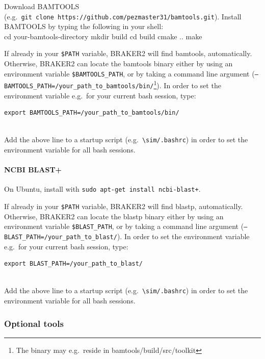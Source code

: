 \documentclass[]{article}
\let\oldparagraph\paragraph
\renewcommand{\paragraph}[1]{\oldparagraph{#1}\mbox{}}
\begin{document}
Download BAMTOOLS
(e.g.~\texttt{git\ clone\ https://github.com/pezmaster31/bamtools.git}).
Install BAMTOOLS by typing the following in your shell:\\
cd your-bamtools-directory mkdir build cd build cmake .. make

If already in your \texttt{\$PATH} variable, BRAKER2 will find bamtools,
automatically. Otherwise, BRAKER2 can locate the bamtools binary either
by using an environment variable \texttt{\$BAMTOOLS\_PATH}, or by taking
a command line argument
(\texttt{–BAMTOOLS\_PATH=/your\_path\_to\_bamtools/bin/}\footnote{The
  binary may e.g.~reside in bamtools/build/src/toolkit}). In order to
set the environment variable e.g.~for your current bash session, type:

\begin{verbatim}
export BAMTOOLS_PATH=/your_path_to_bamtools/bin/ 
    
\end{verbatim}

Add the above line to a startup script
(e.g.~\texttt{\textbackslash{}sim/.bashrc}) in order to set the
environment variable for all bash sessions.

\paragraph{NCBI BLAST+}\label{ncbi-blast}

On Ubuntu, install with \texttt{sudo\ apt-get\ install\ ncbi-blast+}.

If already in your \texttt{\$PATH} variable, BRAKER2 will find blastp,
automatically. Otherwise, BRAKER2 can locate the blastp binary either by
using an environment variable \texttt{\$BLAST\_PATH}, or by taking a
command line argument (\texttt{–BLAST\_PATH=/your\_path\_to\_blast/}).
In order to set the environment variable e.g.~for your current bash
session, type:

\begin{verbatim}
export BLAST_PATH=/your_path_to_blast/ 
    
\end{verbatim}

Add the above line to a startup script
(e.g.~\texttt{\textbackslash{}sim/.bashrc}) in order to set the
environment variable for all bash sessions.

\subsubsection{Optional tools}\label{optional-tools}
\end{document}
